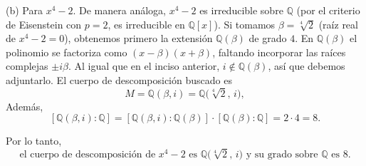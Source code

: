 \begin{solucion}
(b) Para \(x^{4}-2\).  
De manera análoga, \(x^{4}-2\) es irreducible sobre \(\mathbb{Q}\) (por el criterio de Eisenstein con \(p=2\), es irreducible en \(\mathbb{Q}[x]\)).  
Si tomamos \(\beta=\sqrt[4]{2}\) (raíz real de \(x^{4}-2=0\)), obtenemos primero la extensión \(\mathbb{Q}(\beta)\) de grado \(4\).  
En \(\mathbb{Q}(\beta)\) el polinomio se factoriza como \((x-\beta)(x+\beta)\), faltando incorporar las raíces complejas \(\pm i\beta\).  
Al igual que en el inciso anterior, \(i\notin\mathbb{Q}(\beta)\), así que debemos adjuntarlo.  
El cuerpo de descomposición buscado es
\[
M=\mathbb{Q}(\beta,i)=\mathbb{Q}\!\bigl(\sqrt[4]{2},\,i\bigr),
\]
Además,
\[
[\mathbb{Q}(\beta,i):\mathbb{Q}]
  =[\mathbb{Q}(\beta,i):\mathbb{Q}(\beta)]
  \cdot[\mathbb{Q}(\beta):\mathbb{Q}]
  =2\cdot4=8.
\]

Por lo tanto,
\[
\text{el cuerpo de descomposición de }x^{4}-2\text{ es }\mathbb{Q}\bigl(\sqrt[4]{2},\,i\bigr)
\text{ y su grado sobre }\mathbb{Q}\text{ es }8.
\]
\end{solucion}
